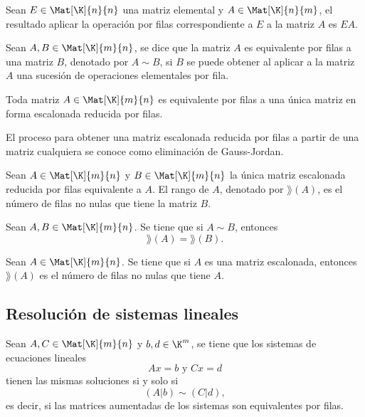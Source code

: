 \documentclass[a4,11pt]{aleph-notas}
\begin{document}
\begin{teo}
    Sean $E\in \Mat[\K]{n}{n}$ una matriz elemental y $A\in\Mat[\K]{n}{m}$, el resultado aplicar la operación por filas correspondiente a $E$ a la matriz $A$ es $EA$.
\end{teo}

\begin{defi}
    Sean $A,B\in \Mat[\K]{m}{n}$, se dice que la matriz $A$ es equivalente por filas a una matriz $B$, denotado por $A\sim B$, si $B$ se puede obtener al aplicar a la matriz $A$ una sucesión de operaciones elementales por fila.
\end{defi}

\begin{teo}
    Toda matriz $A\in\Mat[\K]{m}{n}$ es equivalente por filas a una única matriz en forma escalonada reducida por filas. 
\end{teo}

\begin{advertencia}
    El proceso para obtener una matriz escalonada reducida por filas a partir de una matriz cualquiera se conoce como eliminación de Gauss-Jordan.
\end{advertencia}

\begin{defi}
    Sean $A\in\Mat[\K]{m}{n}$ y $B\in\Mat[\K]{m}{n}$ la única matriz escalonada reducida por filas equivalente a $A$. El rango de $A$, denotado por $\rang(A)$, es el número de filas no nulas que tiene la matriz $B$.  
\end{defi}

\begin{prop}
    Sean $A, B\in\Mat[\K]{m}{n}$. Se tiene que si $A\sim B$, entonces 
    \[
        \rang(A) = \rang(B).
    \]
\end{prop}

\begin{prop}
    Sean $A\in\Mat[\K]{m}{n}$. Se tiene que si $A$ es una matriz escalonada, entonces $\rang(A)$ es el número de filas no nulas que tiene $A$.
\end{prop}

\subsection{Resolución de sistemas lineales}

\begin{teo}
    Sean $A,C\in \Mat[\K]{m}{n}$ y $b,d\in \K^m$, se tiene que los sistemas de ecuaciones lineales
    \[
        Ax=b
        \text{ y }
        Cx=d
    \]
    tienen las mismas soluciones si y solo si
    \[
        (A|b)\sim (C|d),
    \]
    es decir, si las matrices aumentadas de los sistemas son equivalentes por filas. 
\end{teo}
\end{document}
